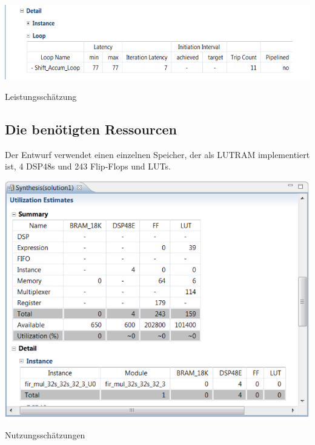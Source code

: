 \begin{minipage}{\textwidth}
    \begin{center}        
        \includegraphics[scale=0.7]{img/Latency.png} 
    \end{center}
\end{minipage}
\begin{center}
Leistungsschätzung
\end{center}

\subsection {Die benötigten Ressourcen}
Der Entwurf verwendet einen einzelnen Speicher, der als LUTRAM implementiert ist, 4 DSP48s und  243 Flip-Flops und LUTs.\\

\begin{minipage}{\textwidth}
    \begin{center}        
        \includegraphics[scale=0.7]{img/Utilization.png} 
    \end{center}
\end{minipage}
\begin{center}
Nutzungsschätzungen
\end{center}


